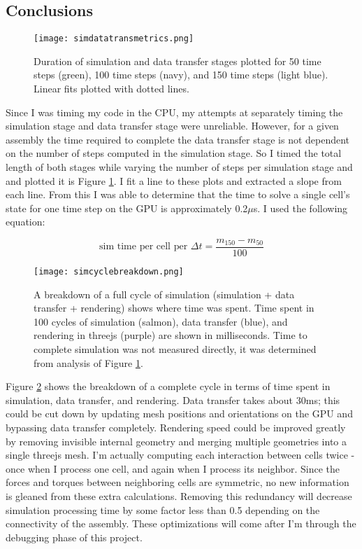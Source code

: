 {\subsection{Conclusions}

\begin{figure}
  \texttt{[image: simdatatransmetrics.png]}
  \caption{Duration of simulation and data transfer stages plotted for 50 time steps (green), 100 time steps (navy), and 150 time steps (light blue). Linear fits plotted with dotted lines.}
  \label{fig:simdatatransmetrics}
\end{figure}

Since I was timing my code in the CPU, my attempts at separately timing the simulation stage and data transfer stage were unreliable.  However, for a given assembly the time required to complete the data transfer stage is not dependent on the number of steps computed in the simulation stage.  So I timed the total length of both stages while varying the number of steps per simulation stage and and plotted it is Figure \ref{fig:simdatatransmetrics}.  I fit a line to these plots and extracted a slope from each line.  From this I was able to determine that the time to solve a single cell's state for one time step on the GPU is approximately 0.2$\mu$s.  I used the following equation:

\[ \text{sim time per cell per } \Delta t = \dfrac{m_{150}-m_{50}}{100} \]

\begin{figure}
  \texttt{[image: simcyclebreakdown.png]}
  \caption{A breakdown of a full cycle of simulation (simulation + data transfer + rendering) shows where time was spent.  Time spent in 100 cycles of simulation (salmon), data transfer (blue), and rendering in threejs (purple) are shown in milliseconds.  Time to complete simulation was not measured directly, it was determined from analysis of Figure \ref{fig:simdatatransmetrics}.}
  \label{fig:simcyclebreakdown}
\end{figure}

Figure \ref{fig:simcyclebreakdown} shows the breakdown of a complete cycle in terms of time spent in simulation, data transfer, and rendering.  Data transfer takes about 30ms; this could be cut down by updating mesh positions and orientations on the GPU and bypassing data transfer completely.  Rendering speed could be improved greatly by removing invisible internal geometry and merging multiple geometries into a single threejs mesh.  I'm actually computing each interaction between cells twice - once when I process one cell, and again when I process its neighbor.  Since the forces and torques between neighboring cells are symmetric, no new information is gleaned from these extra calculations.  Removing this redundancy will decrease simulation processing time by some factor less than 0.5 depending on the connectivity of the assembly.  These optimizations will come after I'm through the debugging phase of this project.

}
